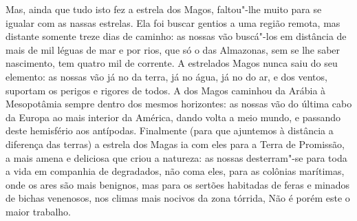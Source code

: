 Mas, ainda que tudo isto fez a estrela dos Magos, faltou"-lhe muito para
se igualar com as nassas estrelas. Ela foi buscar gentios a uma região
remota, mas distante somente treze dias de caminho: as nossas vão
buscá"-los em distância de mais de mil léguas de mar e por rios, que só o
das Almazonas, sem se lhe saber nascimento, tem quatro mil de corrente.
A estrelados Magos nunca saiu do seu elemento: as nossas vão já no da
terra, já no água, já no do ar, e dos ventos, suportam os perigos e
rigores de todos. A dos Magos caminhou da Arábia à Mesopotâmia sempre
dentro dos mesmos horizontes: as nossas vão do última cabo da Europa ao
mais interior da América, dando volta a meio mundo, e passando deste
hemisfério aos antípodas. Finalmente (para que ajuntemos à distância a
diferença das terras) a estrela dos Magas ia com eles para a Terra de
Promissão, a mais amena e deliciosa que criou a natureza: as nossas
desterram"-se para toda a vida em companhia de degradados, não coma eles,
para as colônias marítimas, onde os ares são mais benignos, mas para os
sertões habitadas de feras e minados de bichas venenosos, nos climas
mais nocivos da zona tórrida, Não é porém este o maior trabalho.

